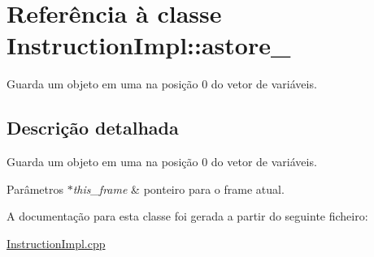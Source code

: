 \hypertarget{class_instruction_impl_1_1astore__0}{}\section{Referência à classe Instruction\+Impl\+:\+:astore\+\_}
\label{class_instruction_impl_1_1astore__0}


Guarda um objeto em uma na posição 0 do vetor de variáveis.  




\subsection{Descrição detalhada}
Guarda um objeto em uma na posição 0 do vetor de variáveis. 


\begin{DoxyParams}{Parâmetros}
{\em $\ast$this\+\_\+frame} & ponteiro para o frame atual.  \\
\hline
\end{DoxyParams}


A documentação para esta classe foi gerada a partir do seguinte ficheiro\+:\begin{DoxyCompactItemize}
\item 
\hyperlink{_instruction_impl_8cpp}{Instruction\+Impl.\+cpp}\end{DoxyCompactItemize}
